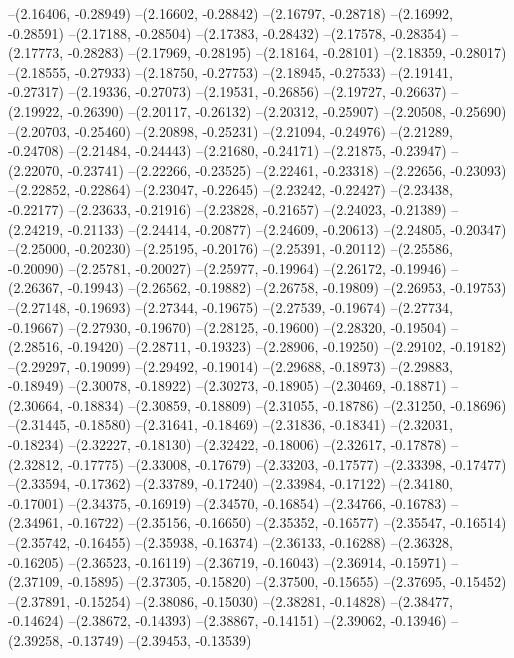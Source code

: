 --(2.16406, -0.28949)
--(2.16602, -0.28842)
--(2.16797, -0.28718)
--(2.16992, -0.28591)
--(2.17188, -0.28504)
--(2.17383, -0.28432)
--(2.17578, -0.28354)
--(2.17773, -0.28283)
--(2.17969, -0.28195)
--(2.18164, -0.28101)
--(2.18359, -0.28017)
--(2.18555, -0.27933)
--(2.18750, -0.27753)
--(2.18945, -0.27533)
--(2.19141, -0.27317)
--(2.19336, -0.27073)
--(2.19531, -0.26856)
--(2.19727, -0.26637)
--(2.19922, -0.26390)
--(2.20117, -0.26132)
--(2.20312, -0.25907)
--(2.20508, -0.25690)
--(2.20703, -0.25460)
--(2.20898, -0.25231)
--(2.21094, -0.24976)
--(2.21289, -0.24708)
--(2.21484, -0.24443)
--(2.21680, -0.24171)
--(2.21875, -0.23947)
--(2.22070, -0.23741)
--(2.22266, -0.23525)
--(2.22461, -0.23318)
--(2.22656, -0.23093)
--(2.22852, -0.22864)
--(2.23047, -0.22645)
--(2.23242, -0.22427)
--(2.23438, -0.22177)
--(2.23633, -0.21916)
--(2.23828, -0.21657)
--(2.24023, -0.21389)
--(2.24219, -0.21133)
--(2.24414, -0.20877)
--(2.24609, -0.20613)
--(2.24805, -0.20347)
--(2.25000, -0.20230)
--(2.25195, -0.20176)
--(2.25391, -0.20112)
--(2.25586, -0.20090)
--(2.25781, -0.20027)
--(2.25977, -0.19964)
--(2.26172, -0.19946)
--(2.26367, -0.19943)
--(2.26562, -0.19882)
--(2.26758, -0.19809)
--(2.26953, -0.19753)
--(2.27148, -0.19693)
--(2.27344, -0.19675)
--(2.27539, -0.19674)
--(2.27734, -0.19667)
--(2.27930, -0.19670)
--(2.28125, -0.19600)
--(2.28320, -0.19504)
--(2.28516, -0.19420)
--(2.28711, -0.19323)
--(2.28906, -0.19250)
--(2.29102, -0.19182)
--(2.29297, -0.19099)
--(2.29492, -0.19014)
--(2.29688, -0.18973)
--(2.29883, -0.18949)
--(2.30078, -0.18922)
--(2.30273, -0.18905)
--(2.30469, -0.18871)
--(2.30664, -0.18834)
--(2.30859, -0.18809)
--(2.31055, -0.18786)
--(2.31250, -0.18696)
--(2.31445, -0.18580)
--(2.31641, -0.18469)
--(2.31836, -0.18341)
--(2.32031, -0.18234)
--(2.32227, -0.18130)
--(2.32422, -0.18006)
--(2.32617, -0.17878)
--(2.32812, -0.17775)
--(2.33008, -0.17679)
--(2.33203, -0.17577)
--(2.33398, -0.17477)
--(2.33594, -0.17362)
--(2.33789, -0.17240)
--(2.33984, -0.17122)
--(2.34180, -0.17001)
--(2.34375, -0.16919)
--(2.34570, -0.16854)
--(2.34766, -0.16783)
--(2.34961, -0.16722)
--(2.35156, -0.16650)
--(2.35352, -0.16577)
--(2.35547, -0.16514)
--(2.35742, -0.16455)
--(2.35938, -0.16374)
--(2.36133, -0.16288)
--(2.36328, -0.16205)
--(2.36523, -0.16119)
--(2.36719, -0.16043)
--(2.36914, -0.15971)
--(2.37109, -0.15895)
--(2.37305, -0.15820)
--(2.37500, -0.15655)
--(2.37695, -0.15452)
--(2.37891, -0.15254)
--(2.38086, -0.15030)
--(2.38281, -0.14828)
--(2.38477, -0.14624)
--(2.38672, -0.14393)
--(2.38867, -0.14151)
--(2.39062, -0.13946)
--(2.39258, -0.13749)
--(2.39453, -0.13539)
